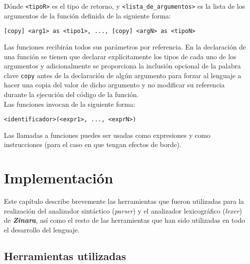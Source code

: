 \documentclass[12pt, spanish]{report}
\begin{document}
D\'onde \texttt{<tipoR>} es el tipo de retorno, y
\texttt{<lista\_de\_argumentos>} es la lista de los argumentos de la
funci\'on definida de la siguiente forma:

\begin{verbatim}
[copy] <arg1> as <tipo1>, ..., [copy] <argN> as <tipoN>
\end{verbatim}

Las funciones recibir\'an todos sus par\'ametros por referencia. En la
declaraci\'on de una funci\'on se tienen que declarar expl\'icitamente los
tipos de cada uno de los argumentos y adicionalmente se proporciona la
inclusi\'on opcional de la palabra clave \texttt{copy} antes de la
declaraci\'on de alg\'un argumento para forzar al lenguaje a hacer una
copia del valor de dicho argumento y no modificar su referencia
durante la ejecuci\'on del c\'odigo de la funci\'on.\\

Las funciones invocan de la siguiente forma:
\begin{verbatim}
<identificador>(<expr1>, ..., <exprN>)
\end{verbatim}
Las llamadas a funciones puedes ser usadas como expresiones y como
instrucciones (para el caso en que tengan efectos de borde).

\chapter{Implementaci\'on}
\label{chap:impl}

Este cap\'itulo describe brevemente las herramientas que fueron
utilizadas para la realizaci\'on del analizador sint\'actico
(\emph{parser}) y el analizador lexicogr\'afico (\emph{lexer}) de
\emph{\textbf{Zinara}}, as\'i como el resto de las herramientas que han
sido utilizadas en todo el desarrollo del lenguaje.

\section{Herramientas utilizadas}
\label{sec:herramientas}
\end{document}
